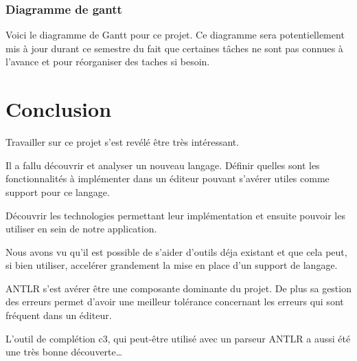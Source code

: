 \documentclass[
    iict, %
    il, %
]{heig-tb}
\begin{document}
\subsection{Diagramme de gantt}
Voici le diagramme de Gantt pour ce projet.
Ce diagramme sera potentiellement mis à jour durant ce semestre du fait que certaines tâches ne sont pas connues à l'avance et pour réorganiser des taches si besoin.



\chapter{Conclusion}



Travailler sur ce projet s'est revélé être très intéressant.


Il a fallu découvrir et analyser un nouveau langage.
Définir quelles sont les fonctionnalités à implémenter dans un éditeur pouvant s'avérer utiles comme support pour ce langage.

Découvrir les technologies permettant leur implémentation et ensuite pouvoir les utiliser en sein de notre application. %



Nous avons vu qu'il est possible de s'aider d'outils déja existant et que cela peut, si bien utiliser, accelérer grandement la mise en place d'un support de langage.

ANTLR s'est avérer être une composante dominante du projet. De plus sa gestion des erreurs permet d'avoir une meilleur tolérance concernant les erreurs
qui sont fréquent dans un éditeur.

L'outil de complétion c3, qui peut-être utilisé avec un parseur ANTLR a aussi été une très bonne découverte\dots
\end{document}

